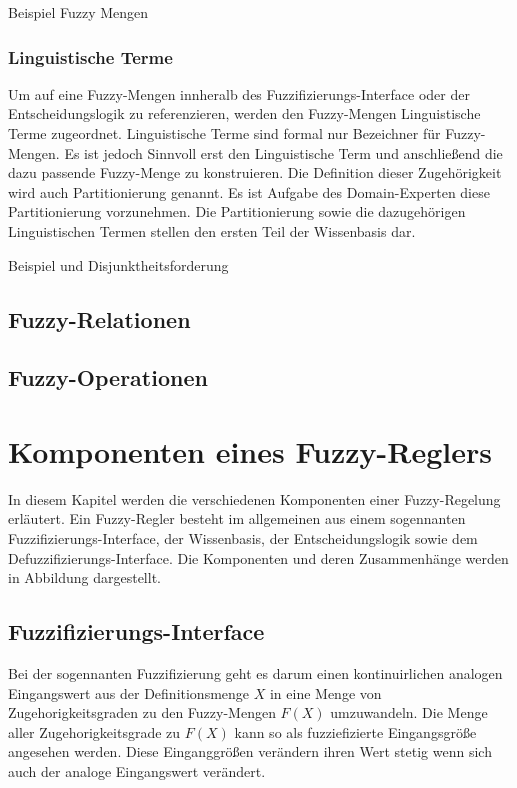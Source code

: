 \documentclass[12pt,a4paper,bibliography=totocnumbered,listof=totocnumbered]{scrartcl}
\begin{document}
Beispiel Fuzzy Mengen

\subsubsection{Linguistische Terme}

Um auf eine Fuzzy-Mengen innheralb des Fuzzifizierungs-Interface oder der Entscheidungslogik zu referenzieren, werden den Fuzzy-Mengen Linguistische Terme zugeordnet. Linguistische Terme sind formal nur Bezeichner für Fuzzy-Mengen. Es ist jedoch Sinnvoll erst den Linguistische Term und anschließend die dazu passende Fuzzy-Menge zu konstruieren. Die Definition dieser Zugehörigkeit wird auch Partitionierung genannt. Es ist Aufgabe des Domain-Experten diese Partitionierung vorzunehmen. Die Partitionierung sowie die dazugehörigen Linguistischen Termen stellen den ersten Teil der Wissenbasis dar.

Beispiel und Disjunktheitsforderung

\subsection{Fuzzy-Relationen}

\subsection{Fuzzy-Operationen}

\section{Komponenten eines Fuzzy-Reglers}

In diesem Kapitel werden die verschiedenen Komponenten einer Fuzzy-Regelung erläutert. Ein Fuzzy-Regler besteht im allgemeinen aus einem sogennanten Fuzzifizierungs-Interface, der Wissenbasis, der Entscheidungslogik sowie dem Defuzzifizierungs-Interface. Die Komponenten und deren Zusammenhänge werden in Abbildung dargestellt.

\subsection{Fuzzifizierungs-Interface}

Bei der sogennanten Fuzzifizierung geht es darum einen kontinuirlichen analogen Eingangswert aus der Definitionsmenge $X$ in eine Menge von Zugehorigkeitsgraden zu den Fuzzy-Mengen $F(X)$ umzuwandeln. Die Menge aller Zugehorigkeitsgrade zu $F(X)$ kann so als fuzziefizierte Eingangsgröße angesehen werden. Diese Einganggrößen verändern ihren Wert stetig wenn sich auch der analoge Eingangswert verändert. 
\end{document}
